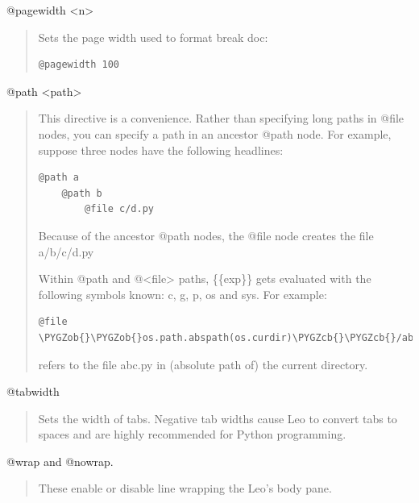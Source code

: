 \documentclass[a4paper,10pt,english]{sphinxmanual}
\def\PYGZob{\char`\{}
\def\PYGZcb{\char`\}}
\begin{document}
@pagewidth \textless{}n\textgreater{}
\begin{quote}

Sets the page width used to format break doc:

\begin{Verbatim}[commandchars=\\\{\}]
@pagewidth 100
\end{Verbatim}
\end{quote}

@path \textless{}path\textgreater{}
\begin{quote}

This directive is a convenience.  Rather than specifying long paths
in @file nodes, you can specify a path in an ancestor @path node.
For example, suppose three nodes have the following headlines:

\begin{Verbatim}[commandchars=\\\{\}]
@path a
    @path b
        @file c/d.py
\end{Verbatim}

Because of the ancestor @path nodes, the @file node creates the file
a/b/c/d.py

Within @path and @\textless{}file\textgreater{} paths, \{\{exp\}\} gets evaluated with the following
symbols known: c, g, p, os and sys.  For example:

\begin{Verbatim}[commandchars=\\\{\}]
@file \PYGZob{}\PYGZob{}os.path.abspath(os.curdir)\PYGZcb{}\PYGZcb{}/abc.py
\end{Verbatim}

refers to the file abc.py in (absolute path of) the current directory.
\end{quote}

@tabwidth
\begin{quote}

Sets the width of tabs. Negative tab widths cause Leo to convert tabs to
spaces and are highly recommended for Python programming.
\end{quote}

@wrap and @nowrap.
\begin{quote}

These enable or disable line wrapping the Leo's body pane.
\end{quote}
\end{document}
